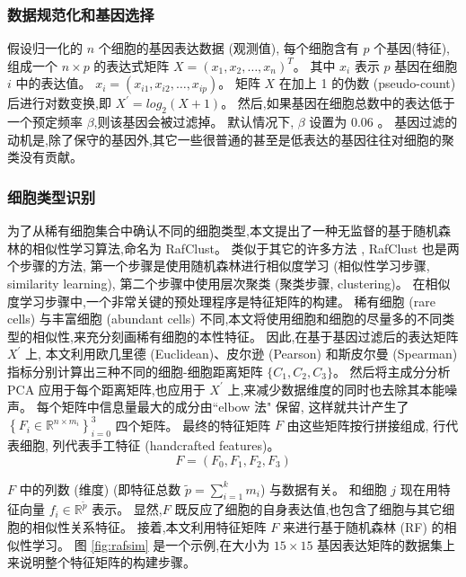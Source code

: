 \subsubsection{数据规范化和基因选择}
\label{subsec:datapreprocessing} 

假设归一化的 $n$ 个细胞的基因表达数据 (观测值), 每个细胞含有 $p$ 个基因(特征),
组成一个 $n \times p$ 的表达式矩阵 $X=\left(x_{1}, x_{2}, \ldots, x_{n} \right)^ T$。
其中 $x_{i}$ 表示 $p$ 基因在细胞 $i$ 中的表达值。
$x_{i}=\left(x_{i1}, x_{i2},\ldots, x_{ip} \right)$。
矩阵 $X$ 在加上 1 的伪数 (pseudo-count) 后进行对数变换,即 $X^{\prime} = log_2 (X + 1)$。
然后,如果基因在细胞总数中的表达低于一个预定频率 $\beta$,则该基因会被过滤掉。
默认情况下, $\beta$ 设置为 0.06 。 
基因过滤的动机是,除了保守的基因外,其它一些很普通的甚至是低表达的基因往往对细胞的聚类没有贡献。

\subsubsection{细胞类型识别}
\label{subsec:rafclust} 
为了从稀有细胞集合中确认不同的细胞类型,本文提出了一种无监督的基于随机森林的相似性学习算法,命名为 RafClust。
类似于其它的许多方法 ,
RafClust 也是两个步骤的方法,
第一个步骤是使用随机森林进行相似度学习 (相似性学习步骤, similarity learning),
第二个步骤中使用层次聚类 (聚类步骤, clustering)。
在相似度学习步骤中,一个非常关键的预处理程序是特征矩阵的构建。
稀有细胞 (rare cells) 与丰富细胞 (abundant cells) 不同,本文将使用细胞和细胞的尽量多的不同类型的相似性,来充分刻画稀有细胞的本性特征。
因此,在基于基因过滤后的表达矩阵 $X^{\prime}$ 上,
本文利用欧几里德 (Euclidean)、皮尔逊 (Pearson) 和斯皮尔曼 (Spearman) 指标分别计算出三种不同的细胞-细胞距离矩阵 $\{C_1, C_2, C_3\}$。
然后将主成分分析 PCA 应用于每个距离矩阵,也应用于 $X^{\prime}$ 上,来减少数据维度的同时也去除其本能噪声。
每个矩阵中信息量最大的成分由``elbow 法"  保留,
这样就共计产生了 $\left\{ {F}_{i} \in \mathbb {R} ^ {n \times m_{i}} \right\}_{i = 0}^{3}$ 四个矩阵。
最终的特征矩阵 $F$ 由这些矩阵按行拼接组成, 行代表细胞, 列代表手工特征 (handcrafted features)。
\begin{equation}
\label{lab:f}
{F} = ({F}_{0}, {F}_{1}, {F}_{2}, {F}_{3})
\end{equation}

$F$ 中的列数 (维度) (即特征总数 $\tilde {p} = \sum_{i = 1}^{k} m_{i}$) 与数据有关。
和细胞 $j$ 现在用特征向量 $f_{i} \in \mathbb {R} ^ {\tilde{p}}$ 表示。
显然,$F$ 既反应了细胞的自身表达值,也包含了细胞与其它细胞的相似性关系特征。
接着,本文利用特征矩阵 $F$ 来进行基于随机森林 (RF) 的相似性学习。
图 \ref{fig:rafsim} 是一个示例,在大小为 $15 \times 15$ 基因表达矩阵的数据集上来说明整个特征矩阵的构建步骤。


